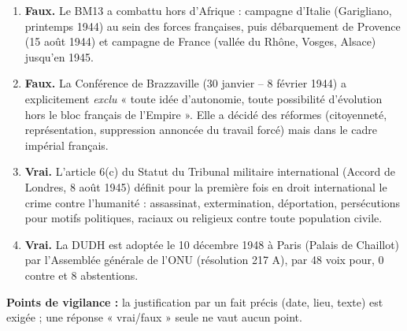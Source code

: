 \documentclass[11pt]{article}
\begin{document}
\begin{corrige}
\begin{enumerate}
\item \textbf{Faux.} Le BM13 a combattu hors d'Afrique : campagne d'Italie (Garigliano, printemps 1944) au sein des forces françaises, puis débarquement de Provence (15 août 1944) et campagne de France (vallée du Rhône, Vosges, Alsace) jusqu'en 1945.
\item \textbf{Faux.} La Conférence de Brazzaville (30 janvier -- 8 février 1944) a explicitement \emph{exclu} « toute idée d'autonomie, toute possibilité d'évolution hors le bloc français de l'Empire ». Elle a décidé des réformes (citoyenneté, représentation, suppression annoncée du travail forcé) mais dans le cadre impérial français.
\item \textbf{Vrai.} L'article 6(c) du Statut du Tribunal militaire international (Accord de Londres, 8 août 1945) définit pour la première fois en droit international le crime contre l'humanité : assassinat, extermination, déportation, persécutions pour motifs politiques, raciaux ou religieux contre toute population civile.
\item \textbf{Vrai.} La DUDH est adoptée le 10 décembre 1948 à Paris (Palais de Chaillot) par l'Assemblée générale de l'ONU (résolution 217 A), par 48 voix pour, 0 contre et 8 abstentions.
\end{enumerate}
\textbf{Points de vigilance :} la justification par un fait précis (date, lieu, texte) est exigée ; une réponse « vrai/faux » seule ne vaut aucun point.
\end{corrige}
\end{document}
